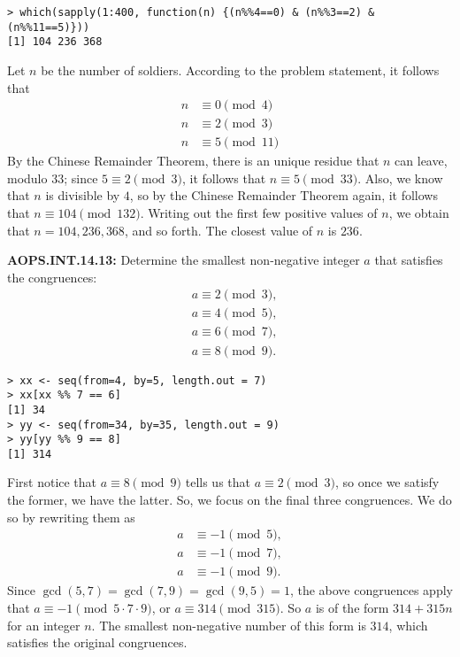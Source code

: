 \documentclass[11pt]{article}
\newenvironment{uzdevums}[1][\unskip]{%
\vspace{3mm}
\noindent
\textbf{#1:}
\noindent}
{}
\begin{document}
\begin{verbatim}
> which(sapply(1:400, function(n) {(n%%4==0) & (n%%3==2) & (n%%11==5)}))
[1] 104 236 368
\end{verbatim}

Let $n$ be the number of soldiers. According to the problem statement, it follows that \begin{align*}
n &\equiv 0 \pmod{4} \\
n &\equiv 2 \pmod{3} \\
n &\equiv 5 \pmod{11}
\end{align*}By the Chinese Remainder Theorem, there is an unique residue that $n$ can leave, modulo $33$; since $5 \equiv 2 \pmod{3}$, it follows that $n \equiv 5 \pmod{33}$. Also, we know that $n$ is divisible by $4$, so by the Chinese Remainder Theorem again, it follows that $n \equiv 104 \pmod{132}$. Writing out the first few positive values of $n$, we obtain that $n = 104, 236, 368$, and so forth. The closest value of $n$ is $\boxed{236}$.


\begin{uzdevums}[AOPS.INT.14.13]
Determine the smallest non-negative integer $a$ that satisfies the congruences: \begin{align*}
&a\equiv 2\pmod 3,\\
&a\equiv 4\pmod 5,\\
&a\equiv 6\pmod 7,\\
&a\equiv 8\pmod 9.
\end{align*}
\end{uzdevums}

\begin{verbatim}
> xx <- seq(from=4, by=5, length.out = 7)
> xx[xx %% 7 == 6]
[1] 34
> yy <- seq(from=34, by=35, length.out = 9)
> yy[yy %% 9 == 8]
[1] 314
\end{verbatim}

First notice that $a\equiv 8\pmod 9$ tells us that $a\equiv 2\pmod 3$, 
so once we satisfy the former, we have the latter. So, we focus on the final three congruences. 
We do so by rewriting them as \begin{align*}
a&\equiv -1\pmod 5,\\
a&\equiv -1\pmod 7,\\
a&\equiv -1\pmod 9.
\end{align*} Since $\gcd(5,7)=\gcd(7,9)=\gcd(9,5)=1$, the above congruences apply that 
$a\equiv -1\pmod{5\cdot 7\cdot 9}$, or $a\equiv 314\pmod{315}$. 
So $a$ is of the form $314+315n$ for an integer $n$. 
The smallest non-negative number of this form is $\boxed{314}$, which satisfies the original congruences.
\end{document}
